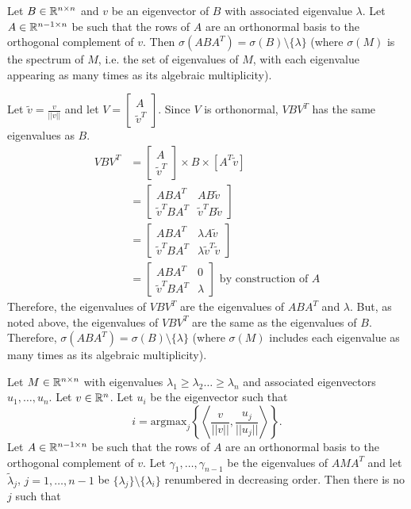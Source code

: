 \documentclass{article}
\newcommand{\argmax}{\text{argmax}}
\begin{document}
\begin{claim}
Let $B\in{\mathbb{R}}^{n\times n}$ and $v$ be an eigenvector of $B$ with associated eigenvalue $\lambda$.  Let $A\in{\mathbb{R}}^{n-1\times n}$ be such that the rows of $A$ are an orthonormal basis to the orthogonal complement of $v$.  Then $\sigma(ABA^T)=\sigma(B)\setminus\{\lambda\}$ (where $\sigma(M)$ is the spectrum of $M$, i.e. the set of eigenvalues of $M$, with each eigenvalue appearing as many times as its algebraic multiplicity).
\end{claim}

\begin{pf}
Let $\tilde{v}=\frac{v}{||v||}$ and let $V=\left[\begin{array}{cc}A \\ \tilde{v}^T\end{array}\right].$  Since $V$ is orthonormal, $VBV^T$ has the same eigenvalues as $B$.
\begin{align*}
VBV^T&=\left[\begin{array}{cc}A \\ \tilde{v}^T\end{array}\right]\times B\times \left[A^T\tilde{v}\right]
\\&=\left[\begin{array}{cc} ABA^T & AB\tilde{v} \\ \tilde{v}^TBA^T & \tilde{v}^TB\tilde{v} \end{array}\right]
\\&=\left[\begin{array}{cc} ABA^T & \lambda A\tilde{v} \\ \tilde{v}^TBA^T & \lambda \tilde{v}^T\tilde{v} \end{array}\right]
\\&=\left[\begin{array}{cc} ABA^T & 0 \\ \tilde{v}^TBA^T & \lambda  \end{array}\right] \text{ by construction of $A$}
\end{align*}
Therefore, the eigenvalues of $VBV^T$ are the eigenvalues of $ABA^T$ and $\lambda$.  But, as noted above, the eigenvalues of $VBV^T$ are the same as the eigenvalues of $B$.  Therefore, $\sigma(ABA^T)=\sigma(B)\setminus\{\lambda\}$ (where $\sigma(M)$ includes each eigenvalue as many times as its algebraic multiplicity).
\end{pf}

\begin{claim}
Let $M\in{\mathbb{R}}^{n\times n}$ with eigenvalues $\lambda_1\geq\lambda_2\dots\geq\lambda_n$ and associated eigenvectors $u_1,\dots,u_n$.  Let $v\in{\mathbb{R}}^n$.  Let $u_i$ be the eigenvector such that 
$$i=\argmax_j\left\{\left\langle \frac{v}{||v||},\frac{u_j}{||u_j||}\right\rangle \right\}.$$
Let $A\in{\mathbb{R}}^{n-1\times n}$ be such that the rows of $A$ are an orthonormal basis to the orthogonal complement of $v$.  Let $\gamma_1,\dots,\gamma_{n-1}$ be the eigenvalues of $AMA^T$ and let $\tilde \lambda_j$, $j=1,\dots,n-1$ be $\{\lambda_j\}\setminus\{\lambda_i\}$ renumbered in decreasing order.  Then 
there is no $j$ such that 
\end{claim}
\end{document}
